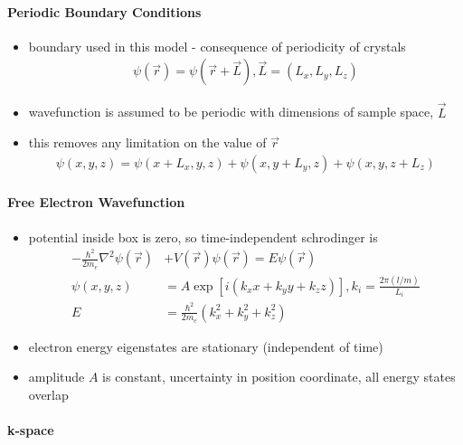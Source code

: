 \documentclass[a4paper,11pt,normalem]{article}
\begin{document}
\paragraph{Periodic Boundary Conditions}

\begin{itemize}
    \item boundary used in this model - consequence of periodicity of crystals
        \begin{align*}
            \psi(\vec{r}) = \psi(\vec{r}+\vec{L}), \vec{L} = (L_x,L_y,L_z)
        \end{align*}
    \item wavefunction is assumed to be periodic with dimensions of sample space, \(\vec{L}\)
    \item this removes any limitation on the value of \(\vec{r}\)
        \begin{align*}
            \psi(x,y,z) = \psi(x+L_x,y,z) + \psi(x,y+L_y,z) + \psi(x,y,z+L_z)
        \end{align*}
\end{itemize}

\paragraph{Free Electron Wavefunction}

\begin{itemize}
    \item potential inside box is zero, so time-independent schrodinger is
        \begin{align*}
            -\frac{\hbar^2}{2m_e}\nabla^2\psi(\vec{r}) &+ V(\vec{r})\psi(\vec{r}) = E\psi(\vec{r})\\
            \psi(x,y,z) &= A\exp\left[i(k_xx + k_yy + k_zz)\right], k_i = \frac{2\pi(l/m)}{L_i}\\
            E &= \frac{\hbar^2}{2m_e}\left(k_x^2 + k_y^2 + k_z^2\right)
        \end{align*}
    \item electron energy eigenstates are stationary (independent of time)
    \item amplitude \(A\) is constant, uncertainty in position coordinate, all energy states overlap
\end{itemize}

\paragraph{k-space}
\end{document}
